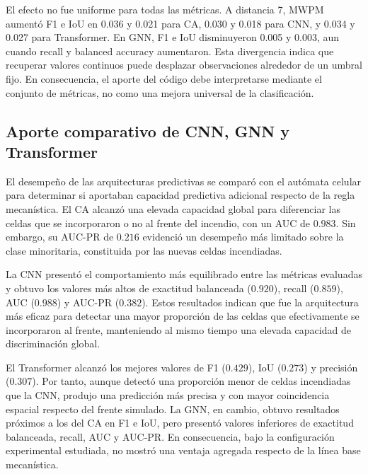 \documentclass[fleqn,10pt]{wlscirep}
\begin{document}
El efecto no fue uniforme para todas las métricas. A distancia 7, MWPM aumentó F1 e IoU en 0.036 y 0.021 para CA, 0.030 y 0.018 para CNN, y 0.034 y 0.027 para Transformer. En GNN, F1 e IoU disminuyeron 0.005 y 0.003, aun cuando recall y balanced accuracy aumentaron. Esta divergencia indica que recuperar valores continuos puede desplazar observaciones alrededor de un umbral fijo. En consecuencia, el aporte del código debe interpretarse mediante el conjunto de métricas, no como una mejora universal de la clasificación.

\subsection*{Aporte comparativo de CNN, GNN y Transformer}

El desempeño de las arquitecturas predictivas se comparó con el
autómata celular para determinar si aportaban capacidad predictiva
adicional respecto de la regla mecanística. El CA alcanzó una elevada
capacidad global para diferenciar las celdas que se incorporaron o no
al frente del incendio, con un AUC de $0.983$. Sin embargo, su
AUC-PR de $0.216$ evidenció un desempeño más limitado sobre la clase
minoritaria, constituida por las nuevas celdas incendiadas.

La CNN presentó el comportamiento más equilibrado entre las métricas
evaluadas y obtuvo los valores más altos de exactitud balanceada
($0.920$), recall ($0.859$), AUC ($0.988$) y AUC-PR ($0.382$).
Estos resultados indican que fue la arquitectura más eficaz para
detectar una mayor proporción de las celdas que efectivamente se
incorporaron al frente, manteniendo al mismo tiempo una elevada
capacidad de discriminación global.

El Transformer alcanzó los mejores valores de F1 ($0.429$), IoU
($0.273$) y precisión ($0.307$). Por tanto, aunque detectó una
proporción menor de celdas incendiadas que la CNN, produjo una
predicción más precisa y con mayor coincidencia espacial respecto del
frente simulado. La GNN, en cambio, obtuvo resultados próximos a los
del CA en F1 e IoU, pero presentó valores inferiores de exactitud
balanceada, recall, AUC y AUC-PR. En consecuencia, bajo la configuración
experimental estudiada, no mostró una ventaja agregada respecto de la
línea base mecanística.
\end{document}
